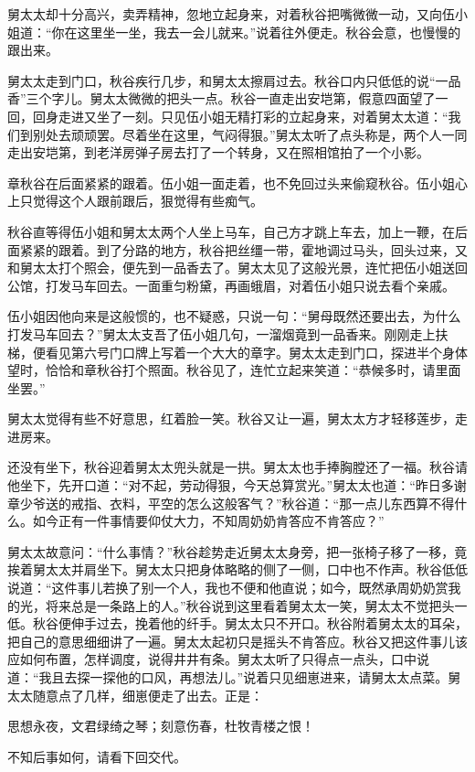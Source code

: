 \documentclass[12pt,UTF8]{ctexbook}
\begin{document}
{{{舅太太却十分高兴，卖弄精神，忽地立起身来，对着秋谷把嘴微微一动，又向伍小姐道：“你在这里坐一坐，我去一会儿就来。”说着往外便走。秋谷会意，也慢慢的跟出来。

舅太太走到门口，秋谷疾行几步，和舅太太擦肩过去。秋谷口内只低低的说“一品香”三个字儿。舅太太微微的把头一点。秋谷一直走出安垲第，假意四面望了一回，回身走进又坐了一刻。只见伍小姐无精打彩的立起身来，对着舅太太道：“我们到别处去顽顽罢。尽着坐在这里，气闷得狠。”舅太太听了点头称是，两个人一同走出安垲第，到老洋房弹子房去打了一个转身，又在照相馆拍了一个小影。

章秋谷在后面紧紧的跟着。伍小姐一面走着，也不免回过头来偷窥秋谷。伍小姐心上只觉得这个人跟前跟后，狠觉得有些痴气。

秋谷直等得伍小姐和舅太太两个人坐上马车，自己方才跳上车去，加上一鞭，在后面紧紧的跟着。到了分路的地方，秋谷把丝缰一带，霍地调过马头，回头过来，又和舅太太打个照会，便先到一品香去了。舅太太见了这般光景，连忙把伍小姐送回公馆，打发马车回去。一面重匀粉黛，再画蛾眉，对着伍小姐只说去看个亲戚。

伍小姐因他向来是这般惯的，也不疑惑，只说一句：“舅母既然还要出去，为什么打发马车回去？”舅太太支吾了伍小姐几句，一溜烟竟到一品香来。刚刚走上扶梯，便看见第六号门口牌上写着一个大大的章字。舅太太走到门口，探进半个身体望时，恰恰和章秋谷打个照面。秋谷见了，连忙立起来笑道：“恭候多时，请里面坐罢。”

舅太太觉得有些不好意思，红着脸一笑。秋谷又让一遍，舅太太方才轻移莲步，走进房来。

还没有坐下，秋谷迎着舅太太兜头就是一拱。舅太太也手捧胸膛还了一福。秋谷请他坐下，先开口道：“对不起，劳动得狠，今天总算赏光。”舅太太也道：“昨日多谢章少爷送的戒指、衣料，平空的怎么这般客气？”秋谷道：“那一点儿东西算不得什么。如今正有一件事情要仰仗大力，不知周奶奶肯答应不肯答应？”

舅太太故意问：“什么事情？”秋谷趁势走近舅太太身旁，把一张椅子移了一移，竟挨着舅太太并肩坐下。舅太太只把身体略略的侧了一侧，口中也不作声。秋谷低低说道：“这件事儿若换了别一个人，我也不便和他直说；如今，既然承周奶奶赏我的光，将来总是一条路上的人。”秋谷说到这里看着舅太太一笑，舅太太不觉把头一低。秋谷便伸手过去，挽着他的纤手。舅太太只不开口。秋谷附着舅太太的耳朵，把自己的意思细细讲了一遍。舅太太起初只是摇头不肯答应。秋谷又把这件事儿该应如何布置，怎样调度，说得井井有条。舅太太听了只得点一点头，口中说道：“我且去探一探他的口风，再想法儿。”说着只见细崽进来，请舅太太点菜。舅太太随意点了几样，细崽便走了出去。正是：

思想永夜，文君绿绮之琴；刻意伤春，杜牧青楼之恨！

不知后事如何，请看下回交代。





}}}
\end{document}
